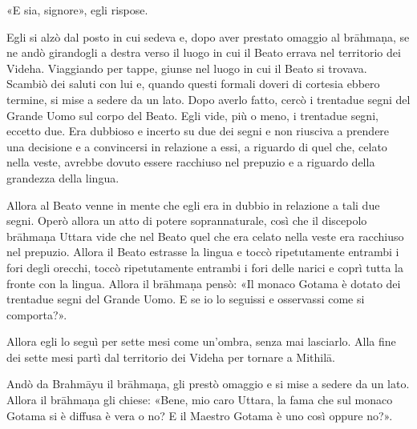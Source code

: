 «E sia, signore», egli rispose.


Egli si alzò dal posto in cui sedeva e, dopo aver prestato omaggio al
brāhmaṇa, se ne andò girandogli a destra verso il luogo in cui il Beato
errava nel territorio dei Videha. Viaggiando per tappe, giunse nel luogo
in cui il Beato si trovava. Scambiò dei saluti con lui e, quando questi
formali doveri di cortesia ebbero termine, si mise a sedere da un lato.
Dopo averlo fatto, cercò i trentadue segni del Grande Uomo sul corpo del
Beato. Egli vide, più o meno, i trentadue segni, eccetto due. Era
dubbioso e incerto su due dei segni e non riusciva a prendere una
decisione e a convincersi in relazione a essi, a riguardo di quel che,
celato nella veste, avrebbe dovuto essere racchiuso nel prepuzio e a
riguardo della grandezza della lingua.


Allora al Beato venne in mente che egli era in dubbio in relazione a
tali due segni. Operò allora un atto di potere soprannaturale, così che
il discepolo brāhmaṇa Uttara vide che nel Beato quel che era celato
nella veste era racchiuso nel prepuzio. Allora il Beato estrasse la
lingua e toccò ripetutamente entrambi i fori degli orecchi, toccò
ripetutamente entrambi i fori delle narici e coprì tutta la fronte con
la lingua. Allora il brāhmaṇa pensò: «Il monaco Gotama è dotato dei
trentadue segni del Grande Uomo. E se io lo seguissi e osservassi come
si comporta?».


Allora egli lo seguì per sette mesi come un’ombra, senza mai lasciarlo.
Alla fine dei sette mesi partì dal territorio dei Videha per tornare a
Mithilā.


Andò da Brahmāyu il brāhmaṇa, gli prestò omaggio e si mise a sedere da
un lato. Allora il brāhmaṇa gli chiese: «Bene, mio caro Uttara, la fama
che sul monaco Gotama si è diffusa è vera o no? E il Maestro Gotama è
uno così oppure no?».


